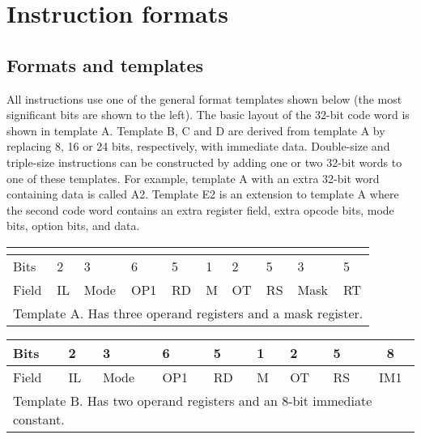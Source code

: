 \documentclass[forwardcom.tex]{subfiles}
\begin{document}
\RaggedRight

\chapter{Instruction formats}
\section{Formats and templates}
All instructions use one of the general format templates shown below (the most significant bits are shown to the left). The basic layout of the 32-bit code word is shown in template A. Template B, C and D are derived from template A by replacing 8, 16 or 24 bits, respectively, with immediate data. Double-size and triple-size instructions can be constructed by adding one or two 32-bit words to one of these templates. For example, template A with an extra 32-bit word containing data is called A2. Template E2 is an extension to template A where the second code word contains an extra register field, extra opcode bits, mode bits, option bits, and data.
\vspace{2mm}


\begin{longtable}[l]
{|p{8mm}|p{8mm}|p{8mm}|p{8mm}|p{8mm}|p{8mm}|p{8mm}|p{8mm}|p{8mm}|p{8mm}|}
\endfirsthead
 \label{table:templateA} \\
\endhead
\hline
 Bits & 2 & 3 & 6 & 5 & 1 & 2 & 5 & 3 & 5 \\
\hline
Field & IL & Mode & OP1 & RD & M & OT & RS & Mask & RT \\
\hline
\multicolumn{10}{|l|}{
Template A. Has three operand registers and a mask register.} \\
\hline
\end{longtable}

\begin{longtable}[l]{|p{8mm}|p{8mm}|p{8mm}|p{8mm}|p{8mm}|p{8mm}|p{8mm}|p{8mm}|p{8mm}|p{16mm}|}
\endfirsthead
\label{table:templateB}
\endhead
\hline
  Bits & 2 & 3 & 6 & 5 & 1 & 2 & 5 & 
  \multicolumn{2}{|c|}{ 8 } \\
\hline
Field & IL & Mode & OP1 & RD & M & OT & RS & 
  \multicolumn{2}{|c|}{ IM1 } \\
\hline
  \multicolumn{10}{|l|}{
Template B. Has two operand registers and an 8-bit immediate constant.}  \\
\hline
\end{longtable}
\end{document}

